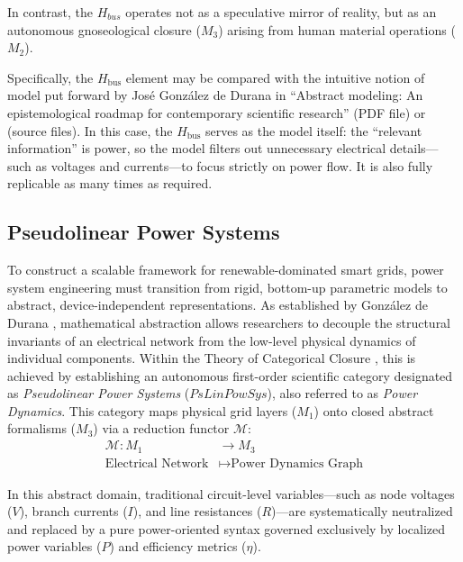 \documentclass[energies,accept,oneauthor,pdftex]{Definitions/mdpi}
\begin{document}
In contrast, the $H_{bus}$ operates not as a speculative mirror of reality, but as an autonomous gnoseological closure ($M_3$) arising from human material operations ($M_2$).

Specifically, the $H_{\text{bus}}$ element may be compared with the intuitive notion of model put forward by José González de Durana in ``Abstract modeling: An epistemological roadmap for contemporary scientific research'' \cite{AbstractModelingEpistemology2026} (PDF file) or \cite{AbstractModelingEpistemology2026b} (source files). In this case, the $H_{\text{bus}}$ serves as the model itself: the ``relevant information'' is power, so the model filters out unnecessary electrical details---such as voltages and currents---to focus strictly on power flow. It is also fully replicable as many times as required.



\subsection{Pseudolinear Power Systems}

To construct a scalable framework for renewable-dominated smart grids, power system engineering must transition from rigid, bottom-up parametric models to abstract, device-independent representations. As established by Gonz\'{a}lez de Durana \cite{AbstractModelingEpistemology2026}, mathematical abstraction allows researchers to decouple the structural invariants of an electrical network from the low-level physical dynamics of individual components. Within the Theory of Categorical Closure \cite{bueno_sciences_2013}, this is achieved by establishing an autonomous first-order scientific category designated as \textit{Pseudolinear Power Systems} ($\mathit{PsLinPowSys}$), also referred to as \textit{Power Dynamics}. This category maps physical grid layers ($M_1$) onto closed abstract formalisms ($M_3$) via a reduction functor $\mathcal{M}$:
\begin{equation}
\begin{aligned}
    \mathcal{M} : M_1 &\to M_3 \\
    \text{Electrical Network} &\mapsto \text{Power Dynamics Graph}
\end{aligned}
\label{eq:gnoseo_map_rev}
\end{equation}

In this abstract domain, traditional circuit-level variables---such as node voltages ($V$), branch currents ($I$), and line resistances ($R$)---are systematically neutralized and replaced by a pure power-oriented syntax governed exclusively by localized power variables ($P$) and efficiency metrics ($\eta$).
\end{document}
